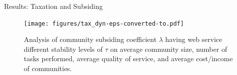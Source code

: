 \documentclass{beamer}
\begin{document}
\begin{frame}{Results: Taxation and Subsiding}
    \begin{figure}[!t]
        \centerline{\texttt{[image: figures/tax\_dyn-eps-converted-to.pdf]}}
        \caption{Analysis of community subsiding coefficient $\lambda$
        having web service different stability levels of $\tau$ on average
        community size, number of tasks performed, average quality of
        service, and average cost/income of communities.}
        \label{fig_dynamic_taxtation}
    \end{figure}
\end{frame}
\end{document}
